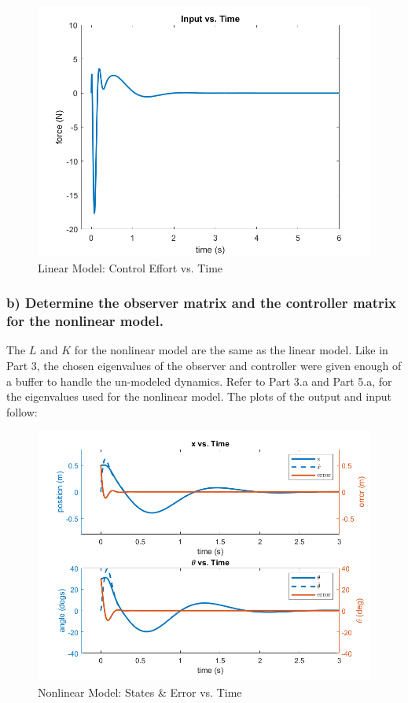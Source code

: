 \documentclass[12pt, letterpaper, onecolumn]{article}
\begin{document}
\begin{figure}[!h]
    \centering
    \includegraphics[width=\linewidth]{figs/p5-a-inputs.png}
    \caption{Linear Model: Control Effort vs. Time}
    \label{}
\end{figure}

\clearpage

\subsubsection*{b) Determine the observer matrix and the controller matrix for the nonlinear model.}
The $L$ and $K$ for the nonlinear model are the same as the linear model. Like in Part 3, the chosen eigenvalues of the observer and controller were given enough of a buffer to handle the un-modeled dynamics. Refer to Part 3.a and Part 5.a, for the eigenvalues used for the nonlinear model. The plots of the output and input follow:

\begin{figure}[!h]
    \centering
    \includegraphics[width=\linewidth]{figs/p5-b-states.png}
    \caption{Nonlinear Model: States \& Error vs. Time}
    \label{}
\end{figure}
\end{document}
